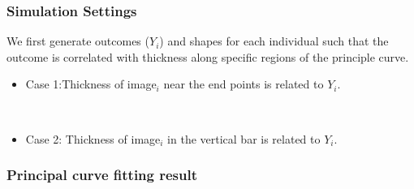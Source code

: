 \documentclass[9 pt]{beamer}
\newcommand{\bi}{\begin{itemize}}
\newcommand{\ei}{\end{itemize}}
\begin{document}
\begin{frame}
\frametitle{Simulation Settings}
We first generate outcomes ($Y_i$) and shapes for each individual such that the outcome is correlated with thickness along specific regions of the principle curve.

\bi
\item<3-| alert@3>Case 1:Thickness of image$_i$ near the end points is related to $Y_i$.
\begin{figure}[!th]
\centering
{}
\end{figure}\

\item<4-| alert@4> Case 2: Thickness of image$_i$ in the vertical bar is related to $Y_i$.
\begin{figure}[!th]
\centering
{}
\end{figure}
\ei
\end{frame}


\begin{frame}
\frametitle{Principal curve fitting result}
\begin{figure}[ht]
\centering
{}
\end{figure}
\end{frame}
\end{document}
